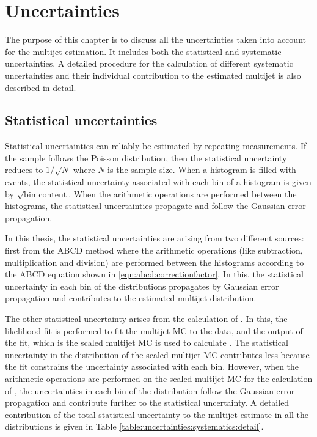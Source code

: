 


\chapter{Uncertainties}
\label{sec:uncertainty_result}
The purpose of this chapter is to discuss all the uncertainties taken into account for the multijet estimation. It includes both the statistical and systematic uncertainties. A detailed procedure for the calculation of different systematic uncertainties and their individual contribution to the estimated multijet is also described in detail. 
\section{Statistical uncertainties}
\label{sec:uncertainties:statistical}
Statistical uncertainties can reliably be estimated by repeating measurements. If the sample follows the Poisson distribution, then the statistical uncertainty reduces to $1/\sqrt{N}$ where $N$ is the sample size. When a histogram is filled with events, the statistical uncertainty associated with each bin of a histogram is given by $\sqrt{\text{bin content}}$. When the arithmetic operations are performed between the histograms, the statistical uncertainties propagate and follow the Gaussian error propagation. 

In this thesis, the statistical uncertainties are arising from two different sources: first from the ABCD method where the arithmetic operations (like subtraction, multiplication and division) are performed between the histograms according to the ABCD equation shown in \ref{eqn:abcd:correctionfactor}. In this, the statistical uncertainty in each bin of the distributions propagates by Gaussian error propagation and contributes to the estimated multijet distribution.

The other statistical uncertainty arises from the calculation of \R. In this, the likelihood fit is performed to fit the multijet MC to the data, and the output of the fit, which is the scaled multijet MC is used to calculate \R. The statistical uncertainty in the distribution of the scaled multijet MC contributes less because the fit constrains the uncertainty associated with each bin. However, when the arithmetic operations are performed on the scaled multijet MC for the calculation of \R, the uncertainties in each bin of the distribution follow the Gaussian error propagation and contribute further to the statistical uncertainty. A detailed contribution of the total statistical uncertainty to the multijet estimate in all the distributions is given in Table \ref{table:uncertainties:systematics:detail}.
